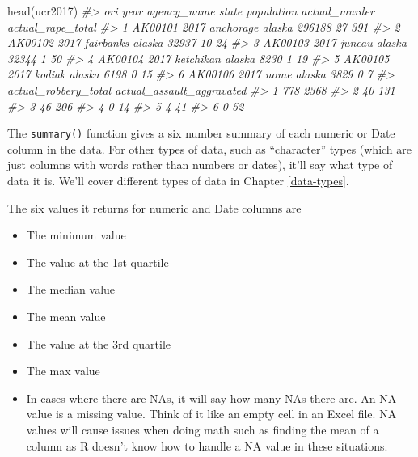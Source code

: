 \documentclass[
]{krantz}
\makeatletter
\newenvironment{Shaded}{\begin{snugshade}}{\end{snugshade}}
\newcommand{\CommentTok}[1]{\textcolor[rgb]{0.37,0.37,0.37}{\textit{#1}}}
\newcommand{\FunctionTok}[1]{\textcolor[rgb]{0,0,0}{#1}}
\newcommand{\NormalTok}[1]{#1}
\providecommand{\tightlist}{%
  \setlength{\itemsep}{0pt}\setlength{\parskip}{0pt}}
\newenvironment{kframe}{%
\medskip{}
\setlength{\fboxsep}{.8em}
 \def\at@end@of@kframe{}%
 \ifinner\ifhmode%
  \def\at@end@of@kframe{\end{minipage}}%
  \begin{minipage}{\columnwidth}%
 \fi\fi%
 \def\FrameCommand##1{\hskip\@totalleftmargin \hskip-\fboxsep
 \colorbox{shadecolor}{##1}\hskip-\fboxsep
     \hskip-\linewidth \hskip-\@totalleftmargin \hskip\columnwidth}%
 \MakeFramed {\advance\hsize-\width
   \@totalleftmargin\z@ \linewidth\hsize
   \@setminipage}}%
 {\par\unskip\endMakeFramed%
 \at@end@of@kframe}
\renewenvironment{Shaded}{\begin{kframe}}{\end{kframe}}
\makeatother
\begin{document}
\begin{Shaded}
\begin{Highlighting}[]
\FunctionTok{head}\NormalTok{(ucr2017)}
\CommentTok{\#\textgreater{}       ori year agency\_name  state population actual\_murder actual\_rape\_total}
\CommentTok{\#\textgreater{} 1 AK00101 2017   anchorage alaska     296188            27               391}
\CommentTok{\#\textgreater{} 2 AK00102 2017   fairbanks alaska      32937            10                24}
\CommentTok{\#\textgreater{} 3 AK00103 2017      juneau alaska      32344             1                50}
\CommentTok{\#\textgreater{} 4 AK00104 2017   ketchikan alaska       8230             1                19}
\CommentTok{\#\textgreater{} 5 AK00105 2017      kodiak alaska       6198             0                15}
\CommentTok{\#\textgreater{} 6 AK00106 2017        nome alaska       3829             0                 7}
\CommentTok{\#\textgreater{}   actual\_robbery\_total actual\_assault\_aggravated}
\CommentTok{\#\textgreater{} 1                  778                      2368}
\CommentTok{\#\textgreater{} 2                   40                       131}
\CommentTok{\#\textgreater{} 3                   46                       206}
\CommentTok{\#\textgreater{} 4                    0                        14}
\CommentTok{\#\textgreater{} 5                    4                        41}
\CommentTok{\#\textgreater{} 6                    0                        52}
\end{Highlighting}
\end{Shaded}

The \texttt{summary()} function gives a six number summary of each numeric or Date column in the data. For other types of data, such as ``character'' types (which are just columns with words rather than numbers or dates), it'll say what type of data it is. We'll cover different types of data in Chapter \ref{data-types}.

The six values it returns for numeric and Date columns are

\begin{itemize}
\tightlist
\item
  The minimum value
\item
  The value at the 1st quartile
\item
  The median value
\item
  The mean value
\item
  The value at the 3rd quartile
\item
  The max value
\item
  In cases where there are NAs, it will say how many NAs there are. An NA value is a missing value. Think of it like an empty cell in an Excel file. NA values will cause issues when doing math such as finding the mean of a column as R doesn't know how to handle a NA value in these situations.
\end{itemize}
\end{document}
